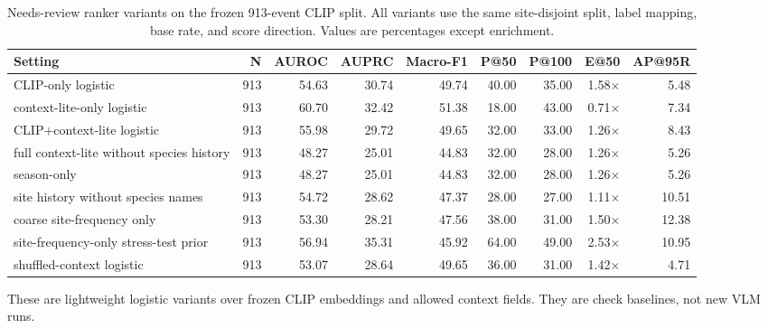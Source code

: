 \begin{table}[h]
\centering
\caption{Needs-review ranker variants on the frozen 913-event CLIP split. All variants use the same site-disjoint split, label mapping, base rate, and score direction. Values are percentages except enrichment.}
\label{tab:ranker_variants}
\scriptsize
\setlength{\tabcolsep}{3pt}
\begin{tabular}{lrrrrrrrr}
\toprule
Setting & N & AUROC & AUPRC & Macro-F1 & P@50 & P@100 & E@50 & AP@95R \\
\midrule
CLIP-only logistic & 913 & 54.63 & 30.74 & 49.74 & 40.00 & 35.00 & 1.58$\times$ & 5.48 \\
context-lite-only logistic & 913 & 60.70 & 32.42 & 51.38 & 18.00 & 43.00 & 0.71$\times$ & 7.34 \\
CLIP+context-lite logistic & 913 & 55.98 & 29.72 & 49.65 & 32.00 & 33.00 & 1.26$\times$ & 8.43 \\
full context-lite without species history & 913 & 48.27 & 25.01 & 44.83 & 32.00 & 28.00 & 1.26$\times$ & 5.26 \\
season-only & 913 & 48.27 & 25.01 & 44.83 & 32.00 & 28.00 & 1.26$\times$ & 5.26 \\
site history without species names & 913 & 54.72 & 28.62 & 47.37 & 28.00 & 27.00 & 1.11$\times$ & 10.51 \\
coarse site-frequency only & 913 & 53.30 & 28.21 & 47.56 & 38.00 & 31.00 & 1.50$\times$ & 12.38 \\
site-frequency-only stress-test prior & 913 & 56.94 & 35.31 & 45.92 & 64.00 & 49.00 & 2.53$\times$ & 10.95 \\
shuffled-context logistic & 913 & 53.07 & 28.64 & 49.65 & 36.00 & 31.00 & 1.42$\times$ & 4.71 \\
\bottomrule
\end{tabular}
\vspace{0.25em}
\begin{minipage}{0.95\linewidth}
\footnotesize These are lightweight logistic variants over frozen CLIP embeddings and allowed context fields. They are check baselines, not new VLM runs.
\end{minipage}
\end{table}
